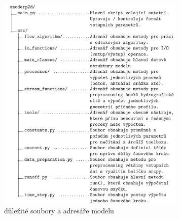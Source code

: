 

\begin{figure}[t!]
  \includegraphics[width=0.8\textwidth]{./img/dirtreenapng.png}
  \caption{důležité soubory a adresáře modelu \smod}
  \label{fig:adresare}
\end{figure}


